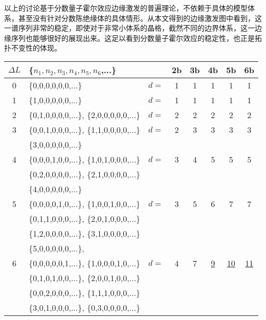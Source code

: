 以上的讨论基于分数量子霍尔效应边缘激发的普遍理论，不依赖于具体的模型体系，甚至没有针对分数陈绝缘体的具体情形。从本文得到的边缘激发图中看到，这一谱序列非常的稳定，即使对于非常小体系的晶格，截然不同的边界体系，这一边缘序列也能够很好的展现出来。这足以看到分数量子霍尔效应的稳定性，也正是拓扑不变性的体现。

\begin{table}[h]
\centering
\begin{tabular}{c|l|l c c c c c}
 \hline
 \hline
$\Delta L$ & \{$n_1,n_2,n_3,n_4,n_5,n_6$,...\}        &  &2b &3b &4b &5b &6b  \\
 \hline
 \hline
     0 & \{0,0,0,0,0,0,...\}                          &$d=$  &1 &1 &1 &1  &1  \\

 \hline
     1 & \{1,0,0,0,0,0,...\}                          &$d=$  &1 &1 &1 &1  &1  \\
 \hline
     2 & \{0,1,0,0,0,0,...\},   \{2,0,0,0,0,0,...\}  &$d=$  &2 &2 &2 &2  &2  \\
 \hline
     3 & \{0,0,1,0,0,0,...\},   \{1,1,0,0,0,0,...\}  &$d=$  &2 &3 &3 &3  &3  \\
       & \{3,0,0,0,0,0,...\}                                                 \\
 \hline
     4 & \{0,0,0,1,0,0,...\},   \{1,0,1,0,0,0,...\}  &$d=$  &3 &4 &5 &5  &5  \\
       & \{0,2,0,0,0,0,...\},   \{2,1,0,0,0,0,...\}                         \\
       & \{4,0,0,0,0,0,...\}                                                 \\
 \hline
     5 & \{0,0,0,0,1,0,...\},   \{1,0,0,1,0,0,...\}  &$d=$  &3 &5 &6 &7  &7  \\
       & \{0,1,1,0,0,0,...\},   \{2,0,1,0,0,0,...\}                         \\
       & \{1,2,0,0,0,0,...\},   \{3,1,0,0,0,0,...\}                         \\
       & \{5,0,0,0,0,0,...\},                                                \\
 \hline
     6 & \{0,0,0,0,0,1,...\},   \{1,0,0,0,1,0,...\}  &$d=$  &4 &7 &\underline{9} &\underline{10} &\underline{11} \\
       & \{0,1,0,1,0,0,...\},   \{2,0,0,1,0,0,...\}                         \\
       & \{0,0,2,0,0,0,...\},   \{1,1,1,0,0,0,...\}                         \\
       & \{3,0,1,0,0,0,...\},   \{0,3,0,0,0,0,...\}                         \\

\end{tabular}
\end{table}
